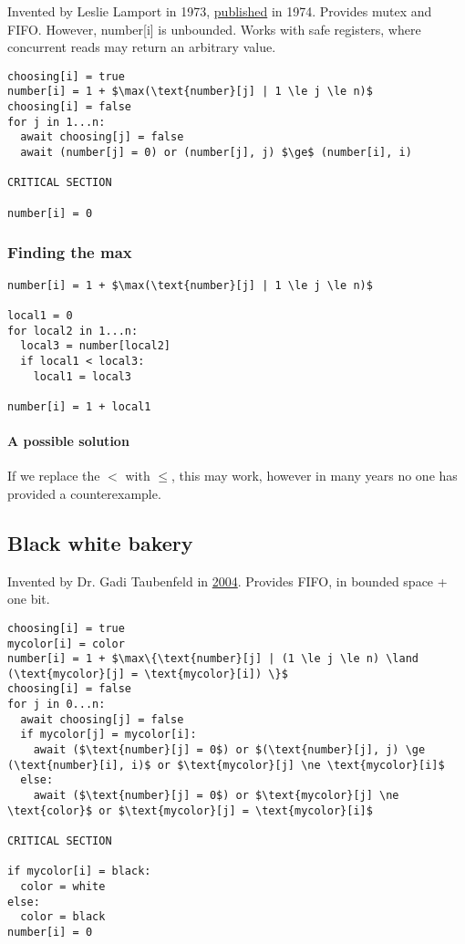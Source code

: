 \documentclass{idc_msc}
\begin{document}
Invented by Leslie Lamport in 1973, \href{http://research.microsoft.com/users/lamport/pubs/bakery.pdf}{published} in 1974.
Provides mutex and FIFO.
However, number[i] is unbounded.
Works with safe registers, where concurrent reads may return an arbitrary value.

\begin{lstlisting}[frame=L,mathescape=true,title={For processes $i=1...n$}]
choosing[i] = true
number[i] = 1 + $\max(\text{number}[j] | 1 \le j \le n)$
choosing[i] = false
for j in 1...n:
  await choosing[j] = false
  await (number[j] = 0) or (number[j], j) $\ge$ (number[i], i)

CRITICAL SECTION

number[i] = 0
\end{lstlisting}

\subsubsection{Finding the max}

\begin{lstlisting}[frame=L,mathescape=true,title={For processes $i=1...n$}]
number[i] = 1 + $\max(\text{number}[j] | 1 \le j \le n)$

local1 = 0
for local2 in 1...n:
  local3 = number[local2]
  if local1 < local3:
    local1 = local3

number[i] = 1 + local1
\end{lstlisting}

\paragraph{A possible solution}
If we replace the $<$ with $\le$, this may work, however in many years no one has provided a counterexample.

\subsection{Black white bakery}

Invented by Dr. Gadi Taubenfeld in \href{https://www.cs.tau.ac.il/~afek/gadi.pdf}{2004}.
Provides FIFO, in bounded space + one bit.

\begin{lstlisting}[frame=L,mathescape=true,title={For processes $i=1...n$}]
choosing[i] = true
mycolor[i] = color
number[i] = 1 + $\max\{\text{number}[j] | (1 \le j \le n) \land (\text{mycolor}[j] = \text{mycolor}[i]) \}$
choosing[i] = false
for j in 0...n:
  await choosing[j] = false
  if mycolor[j] = mycolor[i]:
    await ($\text{number}[j] = 0$) or $(\text{number}[j], j) \ge (\text{number}[i], i)$ or $\text{mycolor}[j] \ne \text{mycolor}[i]$
  else:
    await ($\text{number}[j] = 0$) or $\text{mycolor}[j] \ne \text{color}$ or $\text{mycolor}[j] = \text{mycolor}[i]$

CRITICAL SECTION

if mycolor[i] = black:
  color = white
else:
  color = black
number[i] = 0
\end{lstlisting}
\end{document}
